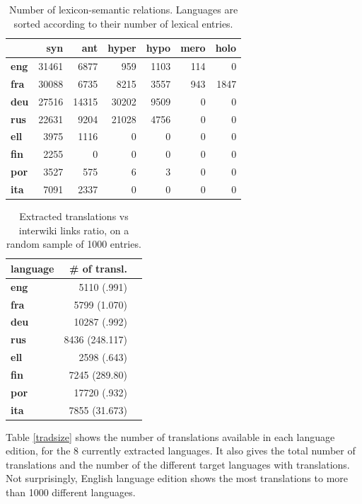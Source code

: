 \documentclass[sw]{iosart2c}
\begin{document}
\begin{table}[htb]
\begin{tabular}{lrrrrrr}
 & \textbf{syn}  & \textbf{ant} & \textbf{hyper} & \textbf{hypo} & \textbf{mero} & \textbf{holo} \\
 \hline
\textbf{eng} & 31461& 6877& 959& 1103& 114& 0 \\ 
\textbf{fra} & 30088& 6735& 8215& 3557& 943& 1847 \\ 
\textbf{deu} & 27516& 14315& 30202& 9509& 0& 0 \\ 
\textbf{rus} & 22631& 9204& 21028& 4756& 0& 0 \\ 
\textbf{ell} & 3975& 1116& 0& 0& 0& 0 \\ 
\textbf{fin} & 2255& 0& 0& 0& 0& 0 \\ 
\textbf{por} & 3527& 575& 6& 3& 0& 0 \\ 
\textbf{ita} & 7091& 2337& 0& 0& 0& 0 \\ 
\end{tabular}
\caption{Number of lexicon-semantic relations. Languages are sorted according to their number of lexical entries.}\label{nymsize}
\end{table}

\begin{table}[htb]
\begin{tabular}{lrr}
\textbf{language} & \textbf{\# of transl.}\\
 \hline
\textbf{eng} & 5110 (.991) \\
\textbf{fra} & 5799 (1.070) \\
\textbf{deu} & 10287 (.992)\\
\textbf{rus} & 8436 (248.117) \\
\textbf{ell} & 2598 (.643) \\
\textbf{fin} & 7245 (289.80) \\
\textbf{por} & 17720 (.932) \\
\textbf{ita} & 7855 (31.673) 
\end{tabular}
\caption{Extracted translations vs interwiki links ratio, on a random sample of 1000 entries.}\label{iwlinks}
\end{table}

Table \ref{tradsize} shows the number of translations available in each language edition, for the 8 currently extracted languages. It also gives the total number of translations and the number of the different target languages with translations. Not surprisingly, English language edition shows the most translations to more than 1000 different languages. 
\end{document}

